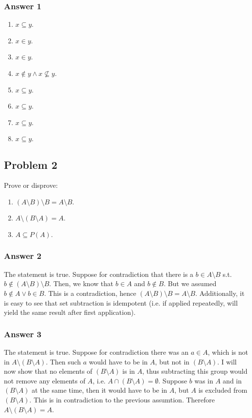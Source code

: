 \documentclass[11pt]{article}
\begin{document}
\subsubsection{Answer 1}
\label{sec-1-1-1}
\begin{enumerate}
\item $x \subseteq y$.
\item $x \in y$.
\item $x \in y$.
\item $x \not \in y \land x \not \subseteq y$.
\item $x \subseteq y$.
\item $x \subseteq y$.
\item $x \subseteq y$.
\item $x \subseteq y$.
\end{enumerate}
\subsection{Problem 2}
\label{sec-1-2}
Prove or disprove:
\begin{enumerate}
\item $(A \setminus B) \setminus B = A \setminus B$.
\item $A \setminus (B \setminus A) = A$.
\item $A \subseteq P(A)$.
\end{enumerate}

\subsubsection{Answer 2}
\label{sec-1-2-1}
The statement is true.  Suppose for contradiction that there is a $b \in A
    \setminus B$ s.t. $b \not \in (A \setminus B) \setminus B$.  Then, we know
that $b \in A$ and $b \not \in B$.  But we assumed $b \not \in A \lor b \in
    B$.  This is a contradiction, hence $(A \setminus B) \setminus B = A
    \setminus B$.  Additionally, it is easy to see that set subtraction is
idempotent (i.e. if applied repeatedly, will yield the same result after
first application).
\subsubsection{Answer 3}
\label{sec-1-2-2}
The statement is true.  Suppose for contradiction there was an $a \in A$,
which is not in $A \setminus (B \setminus A)$.  Then such $a$ would have
to be in $A$, but not in $(B \setminus A)$.  I will now show that no elements
of $(B \setminus A)$ is in $A$, thus subtracting this group would not
remove any elements of $A$, i.e. $A \cap (B \setminus A) = \emptyset$.
Suppose $b$ was in $A$ and in $(B \setminus A)$ at the same time, then
it would have to be in $A$, but $A$ is excluded from $(B \setminus A)$.
This is in contradiction to the previous assumtion.  Therefore
$A \setminus (B \setminus A) = A$.
\end{document}
